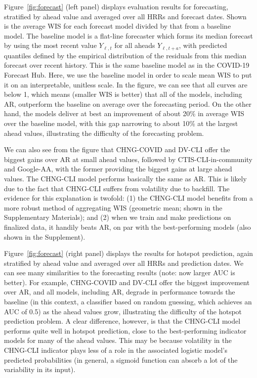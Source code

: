 \documentclass[9pt,twocolumn,twoside,lineno]{pnas-new}
\begin{document}
Figure~\ref{fig:forecast} (left panel) displays evaluation results for
forecasting, stratified by ahead value and averaged over all HRRs and forecast
dates.  Shown is the average WIS for each forecast model divided by that from a
baseline model. The baseline model is a flat-line forecaster which forms its
median forecast by using the most recent value $Y_{\ell,t}$ for all aheads
$Y_{\ell,t+a}$, with predicted quantiles defined by the empirical distribution
of the residuals from this median forecast over recent history. This is the same
baseline model as in the COVID-19 Forecast Hub. Here, we use the baseline model
in order to scale mean WIS to put it on an interpretable, unitless
scale.  In the figure, we can see that all curves are below 1, which means
(smaller WIS is better) that all of the models, including AR, outperform the
baseline on average over the forecasting period.  On the other hand, the models
deliver at best an improvement of about 20\% in average WIS over the baseline
model, with this gap narrowing to about 10\% at the largest ahead values,
illustrating the difficulty of the forecasting problem.

We can also see from the figure that CHNG-COVID and DV-CLI offer the biggest
gains over AR at small ahead values, followed by CTIS-CLI-in-community and
Google-AA, with the former providing the biggest gains at large ahead values.
The CHNG-CLI model performs basically the same as AR.  This is likely due to the
fact that CHNG-CLI suffers from volatility due to backfill.  The evidence for
this explanation is twofold: (1) the CHNG-CLI model benefits from a more robust
method of aggregating WIS (geometric mean; shown in the Supplementary
Materials); and (2) when we train and make predictions on finalized data, it
handily beats AR, on par with the best-performing models (also shown in the
Supplement).

Figure~\ref{fig:forecast} (right panel) displays the results for hotspot
prediction, again stratified by ahead value and averaged over all HRRs and
prediction dates.  We can see many similarities to the forecasting results
(note: now larger AUC is better). For example, CHNG-COVID and DV-CLI offer the
biggest improvement over AR, and all models, including AR, degrade in
performance towards the baseline (in this context, a classifier based on random
guessing, which achieves an AUC of 0.5) as the ahead values grow, illustrating
the difficulty of the hotspot prediction problem. A clear difference, however,
is that the CHNG-CLI model performs quite well in hotspot prediction, close to
the best-performing indicator models for many of the ahead values. This may be
because volatility in the CHNG-CLI indicator plays less of a role in the
associated logistic model's predicted probabilities (in general, a sigmoid
function can absorb a lot of the variability in its input).
\end{document}
